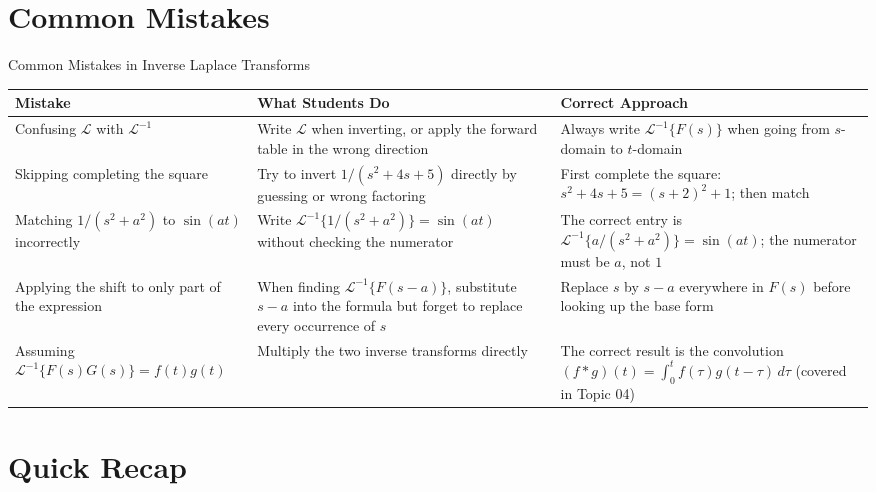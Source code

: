 \documentclass[12pt,a4paper]{article}
\begin{document}
\section{Common Mistakes}

\begin{mistakebox}{Common Mistakes in Inverse Laplace Transforms}
\begin{tabular}{@{}p{4cm}p{5cm}p{5.5cm}@{}}
\toprule
\textbf{Mistake} & \textbf{What Students Do} & \textbf{Correct Approach} \\
\midrule
Confusing $\mathcal{L}$ with $\mathcal{L}^{-1}$ &
  Write $\mathcal{L}$ when inverting, or apply the forward table in the wrong direction &
  Always write $\mathcal{L}^{-1}\{F(s)\}$ when going from $s$-domain to $t$-domain \\
\addlinespace
Skipping completing the square &
  Try to invert $1/(s^2+4s+5)$ directly by guessing or wrong factoring &
  First complete the square: $s^2+4s+5=(s+2)^2+1$; then match \\
\addlinespace
Matching $1/(s^2+a^2)$ to $\sin(at)$ incorrectly &
  Write $\mathcal{L}^{-1}\{1/(s^2+a^2)\}=\sin(at)$ without checking the numerator &
  The correct entry is $\mathcal{L}^{-1}\{a/(s^2+a^2)\}=\sin(at)$; the numerator must be $a$, not $1$ \\
\addlinespace
Applying the shift to only part of the expression &
  When finding $\mathcal{L}^{-1}\{F(s-a)\}$, substitute $s-a$ into the formula but forget to replace every occurrence of $s$ &
  Replace $s$ by $s-a$ everywhere in $F(s)$ before looking up the base form \\
\addlinespace
Assuming $\mathcal{L}^{-1}\{F(s)G(s)\}=f(t)g(t)$ &
  Multiply the two inverse transforms directly &
  The correct result is the convolution $(f*g)(t)=\int_0^t f(\tau)g(t-\tau)\,d\tau$ (covered in Topic 04) \\
\bottomrule
\end{tabular}
\end{mistakebox}

\section{Quick Recap}
\end{document}
